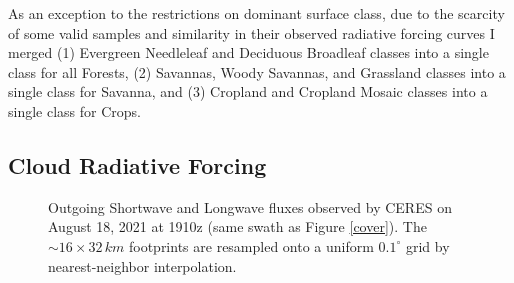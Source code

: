 \documentclass[12pt]{article}
\begin{document}
    As an exception to the restrictions on dominant surface class, due to the scarcity of some valid samples and similarity in their observed radiative forcing curves I merged (1) Evergreen Needleleaf and Deciduous Broadleaf classes into a single class for all Forests, (2) Savannas, Woody Savannas, and Grassland classes into a single class for Savanna, and (3) Cropland and Cropland Mosaic classes into a single class for Crops.


    \subsection{Cloud Radiative Forcing}

    \begin{figure}[h!]\label{flux-interp}
        \centering
        \begin{center}
        \end{center}
        \caption{Outgoing Shortwave and Longwave fluxes observed by CERES on August 18, 2021 at 1910z (same swath as Figure \ref{cover}). The $\sim16\times32\,\si{km}$ footprints are resampled onto a uniform $0.1^\circ$ grid by nearest-neighbor interpolation.}
    \end{figure}
\end{document}
